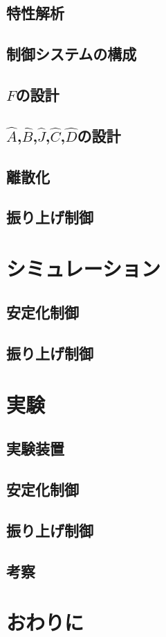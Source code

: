 \documentclass[a4j,11pt,twoside]{ujbook}
\begin{document}
\section{特性解析}
\section{制御システムの構成}
\section{$F$の設計}
\section{$\hat{A}$,$\hat{B}$,$\hat{J}$,$\hat{C}$,$\hat{D}$の設計}
\section{離散化}
\section{振り上げ制御}	

\chapter{シミュレーション}
\section{安定化制御}
\section{振り上げ制御}

\chapter{実験}
\section{実験装置}
\section{安定化制御}
\section{振り上げ制御}
\section{考察}

\chapter{おわりに}
\end{document}
